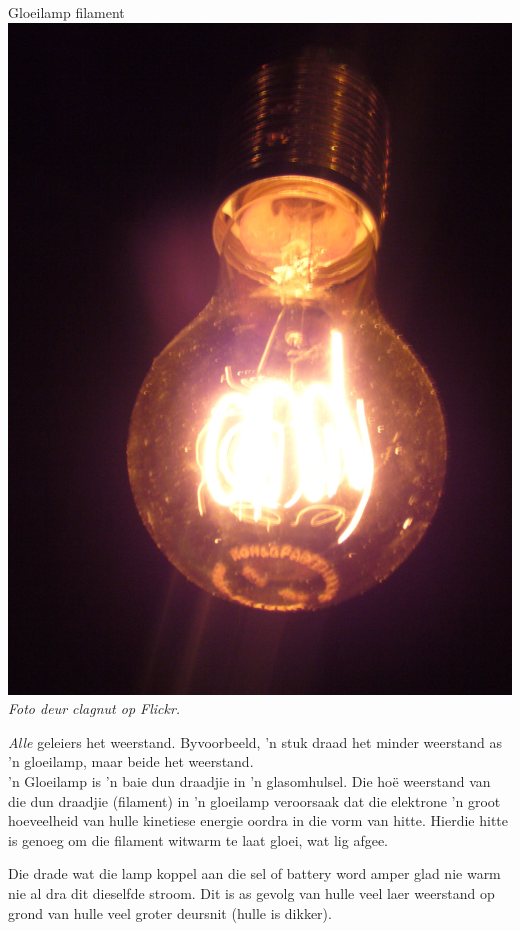 
\begin{minipage}{.5\textwidth}
\begin{center}
Gloeilamp filament\\
\includegraphics[width=.55\textwidth]{photos/lightbulb_by_clagnut.jpg}\\
\textit{Foto deur clagnut op Flickr.}
\end{center}  
\end{minipage}
\begin{minipage}{.5\textwidth}

\textit{Alle} geleiers het weerstand. Byvoorbeeld,  'n stuk draad het
minder weerstand as  'n gloeilamp, maar beide het weerstand. \\

 'n Gloeilamp is  'n baie dun draadjie in  'n glasomhulsel. Die ho\"e weerstand van
die dun draadjie (filament) in  'n gloeilamp veroorsaak dat die elektrone 'n
groot hoeveelheid van hulle kinetiese energie oordra in die vorm van hitte.
Hierdie hitte is genoeg om die filament witwarm te laat gloei, wat lig afgee.

\end{minipage}

Die drade wat die lamp koppel aan die sel of battery word amper glad nie warm
nie al dra dit dieselfde stroom. Dit is as gevolg van hulle veel laer
weerstand op grond van hulle veel groter deursnit (hulle is dikker).

